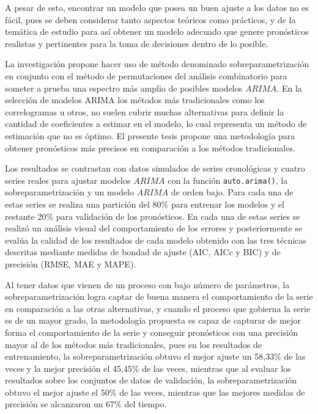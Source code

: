 \documentclass[
]{article}
\begin{document}
A pesar de esto, encontrar un modelo que posea un buen ajuste a los
datos no es fácil, pues se deben considerar tanto aspectos teóricos como
prácticos, y de la temática de estudio para así obtener un modelo
adecuado que genere pronósticos realistas y pertinentes para la toma de
decisiones dentro de lo posible.

La investigación propone hacer uso de método denominado
sobreparametrización en conjunto con el método de permutaciones del
análisis combinatorio para someter a prueba una espectro más amplio de
posibles modelos \(ARIMA\). En la selección de modelos ARIMA los métodos
más tradicionales como los correlogramas u otros, no suelen cubrir
muchas alternativas para definir la cantidad de coeficientes a estimar
en el modelo, lo cual representa un método de estimación que no es
óptimo. El presente tesis propone una metodología para obtener
pronósticos más precisos en comparación a los métodos tradicionales.

Los resultados se contrastan con datos simulados de series cronológicas
y cuatro series reales para ajustar modelos \(ARIMA\) con la función
\texttt{auto.arima()}, la sobreparametrización y un modelo \(ARIMA\) de
orden bajo. Para cada una de estas series se realiza una partición del
80\% para entrenar los modelos y el restante 20\% para validación de los
pronósticos. En cada una de estas series se realizó un análisis visual
del comportamiento de los errores y posteriormente se evalúa la calidad
de los resultados de cada modelo obtenido con las tres técnicas
descritas mediante medidas de bondad de ajuste (AIC, AICc y BIC) y de
precisión (RMSE, MAE y MAPE).

Al tener datos que vienen de un proceso con bajo número de parámetros,
la sobreparametrización logra captar de buena manera el comportamiento
de la serie en comparación a las otras alternativas, y cuando el proceso
que gobierna la serie es de un mayor grado, la metodología propuesta es
capaz de capturar de mejor forma el comportamiento de la serie y
conseguir pronósticos con una precisión mayor al de los métodos más
tradicionales, pues en los resultados de entrenamiento, la
sobreparametrización obtuvo el mejor ajuste un 58,33\% de las veces y la
mejor precisión el 45,45\% de las veces, mientras que al evaluar los
resultados sobre los conjuntos de datos de validación, la
sobreparametrización obtuvo el mejor ajuste el 50\% de las veces,
mientras que las mejores medidas de precisión se alcanzaron un 67\% del
tiempo.

\cleardoublepage
\end{document}
